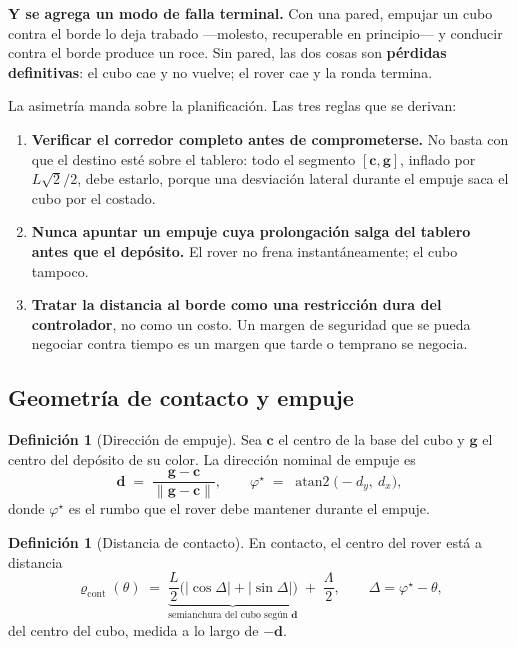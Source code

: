 \documentclass[11pt,a4paper]{article}
\theoremstyle{definition}
\newtheorem{definicion}[teorema]{Definición}
\newcommand{\dd}{\mathbf{d}}
\newcommand{\cc}{\mathbf{c}}
\newcommand{\gv}{\mathbf{g}}
\newcommand{\atantwo}{\operatorname{atan2}}
\begin{document}
\begin{tcolorbox}[colback=black!5,colframe=black!65,boxrule=0.7pt,arc=1pt]
\textbf{Y se agrega un modo de falla terminal.} Con una pared, empujar un cubo contra el
borde lo deja trabado ---molesto, recuperable en principio--- y conducir contra el borde
produce un roce. Sin pared, las dos cosas son \textbf{pérdidas definitivas}: el cubo cae
y no vuelve; el rover cae y la ronda termina.

La asimetría manda sobre la planificación. Las tres reglas que se derivan:
\begin{enumerate}[label=\textbf{R\arabic*.},leftmargin=2.6em,itemsep=3pt]
\item \textbf{Verificar el corredor completo antes de comprometerse.} No basta con que
      el destino esté sobre el tablero: todo el segmento $[\cc,\gv]$, inflado por
      $L\sqrt2/2$, debe estarlo, porque una desviación lateral durante el empuje saca
      el cubo por el costado.
\item \textbf{Nunca apuntar un empuje cuya prolongación salga del tablero antes que el
      depósito.} El rover no frena instantáneamente; el cubo tampoco.
\item \textbf{Tratar la distancia al borde como una restricción dura del controlador},
      no como un costo. Un margen de seguridad que se pueda negociar contra tiempo es un
      margen que tarde o temprano se negocia.
\end{enumerate}
\end{tcolorbox}

\subsection{Geometría de contacto y empuje}
\label{sec:contacto}

\begin{definicion}[Dirección de empuje]
Sea $\cc$ el centro de la base del cubo y $\gv$ el centro del depósito de su color. La
dirección nominal de empuje es
\begin{equation}
  \dd \;=\; \frac{\gv - \cc}{\|\gv - \cc\|},
  \qquad
  \varphi^\star \;=\; \atantwo\big(-d_y,\ d_x\big),
  \label{eq:dir-empuje}
\end{equation}
donde $\varphi^\star$ es el rumbo que el rover debe mantener durante el empuje.
\end{definicion}

\begin{definicion}[Distancia de contacto]
En contacto, el centro del rover está a distancia
\begin{equation}
  \varrho_{\mathrm{cont}}(\theta) \;=\; \underbrace{\frac{L}{2}\Big(|\cos\Delta| + |\sin\Delta|\Big)}_{\text{semianchura del cubo según } \dd}
  \;+\; \frac{\Lambda}{2},
  \qquad \Delta = \varphi^\star - \theta,
  \label{eq:rho-cont}
\end{equation}
del centro del cubo, medida a lo largo de $-\dd$.
\end{definicion}
\end{document}
